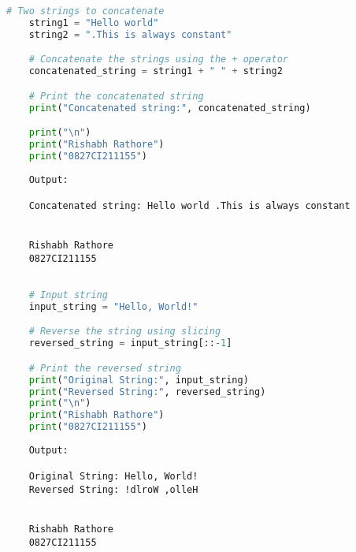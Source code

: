 \documentclass{report}
\begin{document}
\sol{}
\begin{lstlisting}[language=Python]
	# Two strings to concatenate
	string1 = "Hello world"
	string2 = ".This is always constant"

	# Concatenate the strings using the + operator
	concatenated_string = string1 + " " + string2

	# Print the concatenated string
	print("Concatenated string:", concatenated_string)

	print("\n")
	print("Rishabh Rathore")
	print("0827CI211155")
\end{lstlisting}

\begin{verbatim}
	Output:

	Concatenated string: Hello world .This is always constant


	Rishabh Rathore
	0827CI211155
\end{verbatim}
\newpage


\sol{}
\begin{lstlisting}[language=Python]

	# Input string
	input_string = "Hello, World!"

	# Reverse the string using slicing
	reversed_string = input_string[::-1]

	# Print the reversed string
	print("Original String:", input_string)
	print("Reversed String:", reversed_string)
	print("\n")
	print("Rishabh Rathore")
	print("0827CI211155")
\end{lstlisting}

\begin{verbatim}
	Output:

	Original String: Hello, World!
	Reversed String: !dlroW ,olleH
	
	
	Rishabh Rathore
	0827CI211155
\end{verbatim}
\newpage
\end{document}
